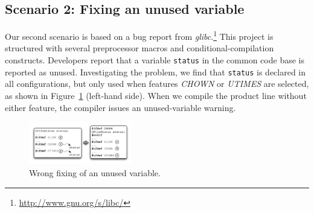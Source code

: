 
\subsection{Scenario 2: Fixing an unused variable}
\label{sec:breaks}

Our second scenario is based on a bug report from \textit{glibc}.\footnote{\url{http://www.gnu.org/s/libc/}} This project is structured with several preprocessor macros and conditional-compilation constructs. Developers report that a variable \texttt{status} in the common code base is reported as unused. Investigating the problem, we find that \texttt{status} is declared in all configurations, but only used when features \emph{CHOWN} or \emph{UTIMES} are selected, as shown in Figure~\ref{fig:gfilestatus-example} (left-hand side). When we compile the product line without either feature, the compiler issues an unused-variable warning. 

\begin{figure}[htp]
    \centering \includegraphics[width=0.4\textwidth]{images/GFileStatus-Example.pdf}
    \caption{Wrong fixing of an unused variable.}
    \label{fig:gfilestatus-example}
\end{figure}

